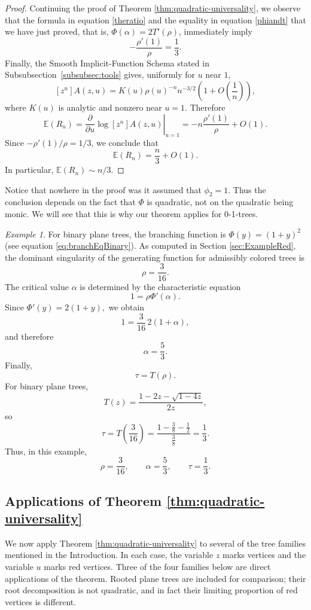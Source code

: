\documentclass[11pt, onesided]{amsart}
\theoremstyle{remark}
\newtheorem{example}[theorem]{Example}
\begin{document}
\begin{proof}
Continuing the proof of Theorem \ref{thm:quadratic-universality}, we observe that
the formula in equation \eqref{theratio} and the equality in equation \eqref{phiandt} that we have just proved, that is, $\Phi(\alpha)=2T'(\rho)$, immediately imply
\[
-\frac{\rho'(1)}{\rho}
=
\frac{1}{3}.
\]
Finally, the Smooth Implicit-Function Schema stated in Subsubsection~\ref{subsubsec:tools} gives, uniformly for
\(u\) near \(1\),
\[
[z^n]A(z,u)
=
K(u)\rho(u)^{-n}n^{-3/2}
\left(1+O\left(\frac{1}{n}\right)\right),
\]
where \(K(u)\) is analytic and nonzero near \(u=1\). Therefore
\[
\mathbb{E}(R_n)
=
\left.
\frac{\partial}{\partial u}
\log [z^n]A(z,u)
\right|_{u=1}
=
-n\frac{\rho'(1)}{\rho}+O(1).
\]
Since $-\rho'(1)/\rho=1/3$,
we conclude that
\[
\mathbb{E}(R_n)
=
\frac{n}{3}+O(1).
\]
In particular, $\mathbb{E}(R_n)\sim n/3$.
\end{proof}

Notice that nowhere in the proof was it assumed that
\(\phi_2=1\). Thus the conclusion depends on the fact that
\(\Phi\) is quadratic, not on the quadratic being monic.  We will see that this is why our theorem applies
for 0-1-trees. 



\begin{example}
For binary plane trees, the branching function is
$
\Phi(y)=(1+y)^2
$ 
(see equation \eqref{eq:branchEqBinary}).
As computed in Section \ref{sec:ExampleRed}, the dominant singularity of the generating function for admissibly colored trees is
\[
\rho=\frac{3}{16}.
\]
The critical value \(\alpha\) is determined by the characteristic equation
\[
1=\rho\Phi'(\alpha).
\]
Since
$
\Phi'(y)=2(1+y),
$
we obtain
\[
1=\frac{3}{16}\,2(1+\alpha),
\]
and therefore
\[
\alpha=\frac{5}{3}.
\]
Finally,
\[
\tau=T(\rho).
\]
For binary plane trees,
\[
T(z)=\frac{1-2z-\sqrt{1-4z}}{2z},
\]
so
\[
\tau=T\left(\frac{3}{16}\right)
=\frac{1-\frac{3}{8}-\frac12}{\frac{3}{8}}
=\frac13.
\]
Thus, in this example,
\[
{\rho=\frac{3}{16},\qquad \alpha=\frac53,\qquad \tau=\frac13.}
\]
\end{example}

\subsection{Applications of Theorem \ref{thm:quadratic-universality}}
\label{subsec:appIdeal}

We now apply Theorem \ref{thm:quadratic-universality} to several of the tree families mentioned in the Introduction. In each case, the variable $z$ marks vertices and the variable $u$ marks red vertices. Three of the four families below are direct applications of the theorem. Rooted plane trees are included for comparison; their root decomposition is not quadratic, and in fact their limiting proportion of red vertices is different.
\end{document}
